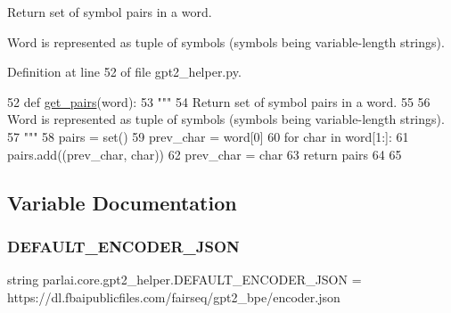 \begin{DoxyVerb}Return set of symbol pairs in a word.

Word is represented as tuple of symbols (symbols being variable-length strings).
\end{DoxyVerb}
 

Definition at line 52 of file gpt2\+\_\+helper.\+py.


\begin{DoxyCode}
52 \textcolor{keyword}{def }\hyperlink{namespaceparlai_1_1core_1_1gpt2__helper_ac5bffa2aece99e43444185ba85dff425}{get\_pairs}(word):
53     \textcolor{stringliteral}{"""}
54 \textcolor{stringliteral}{    Return set of symbol pairs in a word.}
55 \textcolor{stringliteral}{}
56 \textcolor{stringliteral}{    Word is represented as tuple of symbols (symbols being variable-length strings).}
57 \textcolor{stringliteral}{    """}
58     pairs = set()
59     prev\_char = word[0]
60     \textcolor{keywordflow}{for} char \textcolor{keywordflow}{in} word[1:]:
61         pairs.add((prev\_char, char))
62         prev\_char = char
63     \textcolor{keywordflow}{return} pairs
64 
65 
\end{DoxyCode}


\subsection{Variable Documentation}
\mbox{\label{namespaceparlai_1_1core_1_1gpt2__helper_aeb53e5722eee3791e6921df0a571263c}} 
\subsubsection{\texorpdfstring{D\+E\+F\+A\+U\+L\+T\+\_\+\+E\+N\+C\+O\+D\+E\+R\+\_\+\+J\+S\+ON}{DEFAULT\_ENCODER\_JSON}}
{\footnotesize\ttfamily string parlai.\+core.\+gpt2\+\_\+helper.\+D\+E\+F\+A\+U\+L\+T\+\_\+\+E\+N\+C\+O\+D\+E\+R\+\_\+\+J\+S\+ON = \textquotesingle{}https\+://dl.\+fbaipublicfiles.\+com/fairseq/gpt2\+\_\+bpe/encoder.\+json\textquotesingle{}}




